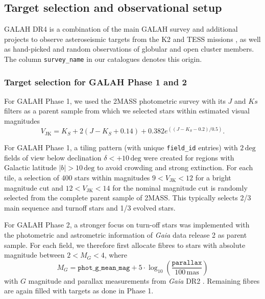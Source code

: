 \documentclass[
  journal=pasa,
  manuscript=research-paper, %
  year=2023,
  volume=37
]{cup-journal}
\newcommand{\Gaia}{\textit{Gaia}\xspace}
\begin{document}
\subsection{Target selection and observational setup} \label{sec:target_selection_observations}

GALAH DR4 is a combination of the main GALAH survey and additional projects to observe asteroseismic targets from the K2 \cite{Sharma2019} and TESS missions \cite{Sharma2018}, as well as hand-picked and random observations of globular and open cluster members. The column \texttt{survey\_name} in our catalogues denotes this origin.

\subsubsection{Target selection for GALAH Phase 1 and 2}

For GALAH Phase 1, we used the 2MASS photometric survey \citep{Skrutskie2006} with its $J$ and $Ks$ filters as a parent sample from which we selected stars within estimated visual magnitudes
\begin{equation}
V_\mathrm{JK} = K_S+2(J-K_S+0.14)+0.382e^{((J-K_S-0.2)/0.5)}.
\end{equation}

For GALAH Phase 1, a tiling pattern (with unique \texttt{field\_id} entries) with $2\,\mathrm{deg}$ fields of view below declination $\delta < +10\,\mathrm{deg}$ were created for regions with Galactic latitude $\vert b \vert > 10\,\mathrm{deg}$ to avoid crowding and strong extinction. For each tile, a selection of 400 stars within magnitudes $9 < V_\mathrm{JK} < 12$ for a bright magnitude cut and $12 < V_\mathrm{JK} < 14$ for the nominal magnitude cut is randomly selected from the complete parent sample of 2MASS. This typically selects 2/3 main sequence and turnoff stars and 1/3 evolved stars.

For GALAH Phase 2, a stronger focus on turn-off stars was implemented with the photometric and astrometric information of \Gaia data release 2 as parent sample. For each field, we therefore first allocate fibres to stars with absolute magnitude between $2 < M_G < 4$, where
\begin{equation}
M_G = \texttt{phot\_g\_mean\_mag} + 5 \cdot \log_{10} \left( \frac{\texttt{parallax}}{100\,\mathrm{mas}} \right)
\end{equation}
with $G$ magnitude and parallax measurements from \Gaia DR2 \citep{Brown2018, Evans2018, Lindegren2018}. Remaining fibres are again filled with targets as done in Phase 1.
\end{document}
